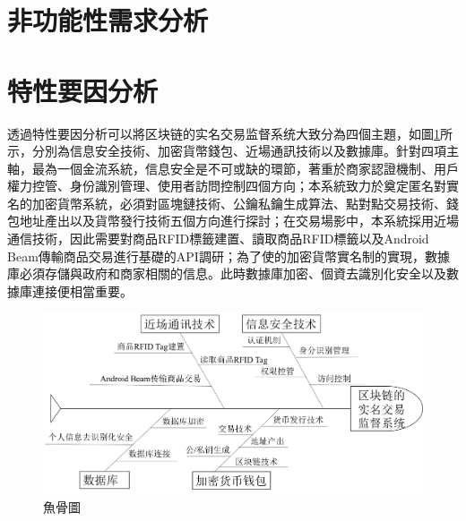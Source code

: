	\section{非功能性需求分析}

	\section{特性要因分析}
	透過特性要因分析可以將区块链的实名交易监督系统大致分為四個主題，如圖\ref{fish1}所示，分別為信息安全技術、加密貨幣錢包、近場通訊技術以及數據庫。針對四項主軸，最為一個金流系統，信息安全是不可或缺的環節，著重於商家認證機制、用戶權力控管、身份識別管理、使用者訪問控制四個方向；本系統致力於奠定匿名對實名的加密貨幣系統，必須對區塊鏈技術、公鑰私鑰生成算法、點對點交易技術、錢包地址產出以及貨幣發行技術五個方向進行探討；在交易場影中，本系統採用近場通信技術，因此需要對商品RFID標籤建置、讀取商品RFID標籤以及Android Beam傳輸商品交易進行基礎的API調研；為了使的加密貨幣實名制的實現，數據庫必須存儲與政府和商家相關的信息。此時數據庫加密、個資去識別化安全以及數據庫連接便相當重要。
		\begin{figure}[!htbp]
			\centering
			\includegraphics[width = 1\textwidth]{fish1.png}
			\caption{魚骨圖}\label{fish1}
		\end{figure}


